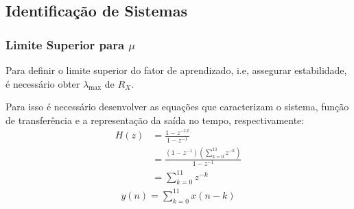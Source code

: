 

\subsection{Identificação de Sistemas} %

\subsubsection*{Limite Superior para $\mu$}

Para definir o limite superior do fator de aprendizado, i.e, assegurar estabilidade, é necessário obter $\lambda_{\max}$ de $R_X$. 

Para isso é necessário desenvolver as equações que caracterizam o sistema, função de transferência e a representação da saída no tempo, respectivamente:
\begin{align*}
    H(z) &= \frac{1 - z^{-12}}{1 - z^{-1}} \\
    &= \frac{(1 - z^{-1})(\sum_{k= 0}^{11} z^{-k})}{1 - z^{-1}} \\
    &= \sum_{k = 0}^{11} z^{-k}
\end{align*}
\begin{align*}
    y(n) = \sum_{k = 0}^{11} x(n-k)
\end{align*}

